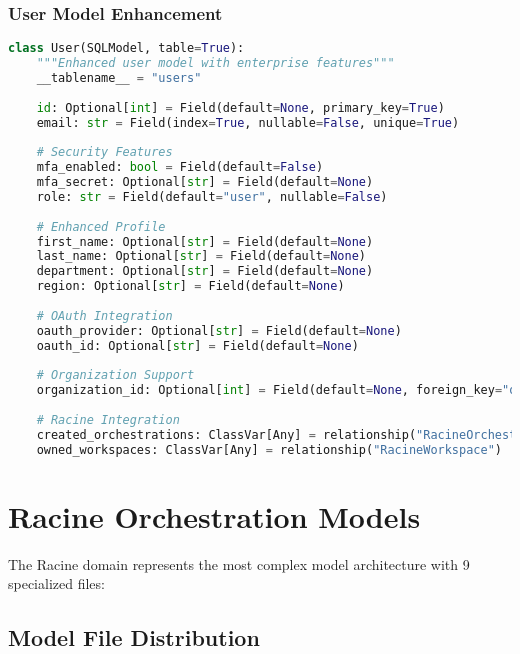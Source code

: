 \subsubsection{User Model Enhancement}
\begin{lstlisting}[language=Python, caption=Enhanced User Model]
class User(SQLModel, table=True):
    """Enhanced user model with enterprise features"""
    __tablename__ = "users"
    
    id: Optional[int] = Field(default=None, primary_key=True)
    email: str = Field(index=True, nullable=False, unique=True)
    
    # Security Features
    mfa_enabled: bool = Field(default=False)
    mfa_secret: Optional[str] = Field(default=None)
    role: str = Field(default="user", nullable=False)
    
    # Enhanced Profile
    first_name: Optional[str] = Field(default=None)
    last_name: Optional[str] = Field(default=None)
    department: Optional[str] = Field(default=None)
    region: Optional[str] = Field(default=None)
    
    # OAuth Integration
    oauth_provider: Optional[str] = Field(default=None)
    oauth_id: Optional[str] = Field(default=None)
    
    # Organization Support
    organization_id: Optional[int] = Field(default=None, foreign_key="organizations.id")
    
    # Racine Integration
    created_orchestrations: ClassVar[Any] = relationship("RacineOrchestrationMaster")
    owned_workspaces: ClassVar[Any] = relationship("RacineWorkspace")
\end{lstlisting}

\section{Racine Orchestration Models}

The Racine domain represents the most complex model architecture with 9 specialized files:

\subsection{Model File Distribution}

